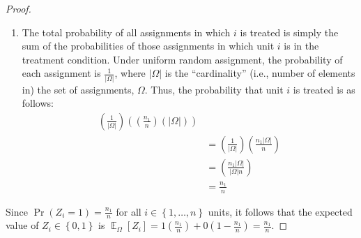 \documentclass[12pt,leqno]{article}
\theoremstyle{newstyle}
\DeclareMathOperator{\E}{\mathbb{E}}
\begin{document}
\begin{proof}
\begin{enumerate}
\item The total probability of all assignments in which $i$ is treated is simply the sum of the probabilities of those assignments in which unit $i$ is in the treatment condition. Under uniform random assignment, the probability of each assignment is $\frac{1}{\left\lvert\Omega\right\rvert}$, where $\left\lvert\Omega\right\rvert$ is the ``cardinality'' (i.e., number of elements in) the set of assignments, $\Omega$. Thus, the probability that unit $i$ is treated is as follows:
\begin{align*}
\left(\frac{1}{\left\lvert\Omega\right\rvert}\right) \left(\left(\frac{n_1}{n}\right)\left(\left\lvert\Omega\right\rvert\right)\right) \\ 
& = \left(\frac{1}{\left\lvert\Omega\right\rvert}\right) \left(\frac{n_1\left\lvert\Omega\right\rvert}{n}\right) \\
& = \left(\frac{n_1\left\lvert\Omega\right\rvert}{\left\lvert\Omega\right\rvert n}\right) \\ 
& = \frac{n_1}{n}  
 \end{align*}
\end{enumerate}

Since $\Pr\left(Z_i = 1\right) = \frac{n_1}{n}$ for all $i \in \left\{1, \dots , n\right\}$ units, it follows that the expected value of $Z_i \in \left\{0, 1\right\}$ is $\E_{\Omega}\left[Z_i\right] = 1\left(\frac{n_1}{n}\right) + 0\left(1 - \frac{n_1}{n}\right) = \frac{n_1}{n}$.
\end{proof}
\end{document}
